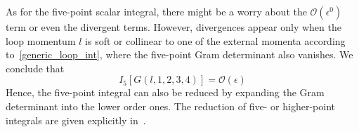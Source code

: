 As for the five-point scalar integral, there might be a worry about the $\mathcal{O}(\epsilon^0)$ term or even the divergent terms.
However, divergences appear only when the loop momentum $l$ is soft or collinear to one of the external momenta according to~\cref{generic_loop_int}, where the five-point Gram determinant also vanishes. 
We conclude that
\begin{equation*}
I_5[G(l,1,2,3,4)] = \mathcal{O}(\epsilon)
\end{equation*}
Hence, the five-point integral can also be reduced by expanding the Gram determinant into the lower order ones.
The reduction of five- or higher-point integrals are given explicitly in~\cite{Gluza:2010ws}.
%
%





